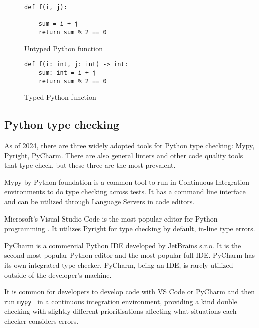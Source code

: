 \begin{figure}[h]
    \centering
     \begin{minipage}{.45\textwidth}
        \centering
        \begin{lstlisting}[linewidth=\textwidth]
def f(i, j):

    sum = i + j
    return sum % 2 == 0
        \end{lstlisting}
        \caption{Untyped Python function}
        \label{untyped_code}
    \end{minipage}%
    \begin{minipage}{.45\textwidth}
        \centering
        \begin{lstlisting}[linewidth=\textwidth]
def f(i: int, j: int) -> int:
    sum: int = i + j
    return sum % 2 == 0
        \end{lstlisting}
        \caption{Typed Python function}
        \label{typed_code}
    \end{minipage}
\end{figure}

\subsection{Python type checking}

As of 2024, there are three widely adopted tools for Python type checking: Mypy, Pyright, PyCharm. There are also general linters and other code quality tools that type check, but these three are the most prevalent.

Mypy by Python foundation is a common tool to run in Continuous Integration environments to do type checking across tests. It has a command line interface and can be utilized through Language Servers in code editors. 

Microsoft's Visual Studio Code is the most popular editor for Python programming \cite{python_software_foundation_jetbrains_sro_python_nodate}. It utilizes Pyright for type checking by default, in-line type errors.

PyCharm is a commercial Python IDE developed by JetBrains s.r.o. It is the second most popular Python editor and the most popular full IDE. PyCharm has its own integrated type checker. PyCharm, being an IDE, is rarely utilized outside of the developer's machine. 

It is common for developers to develop code with VS Code or PyCharm and then run {\tt mypy } in a continuous integration environment, providing a kind double checking with slightly different prioritisations affecting what situations each checker considers errors.

